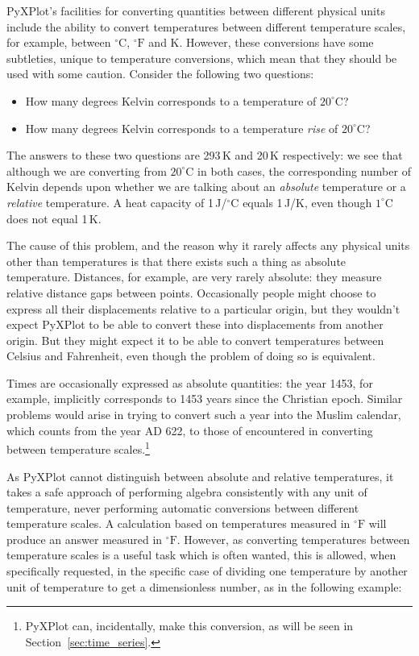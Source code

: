 PyXPlot's facilities for converting quantities between different physical units
include the ability to convert temperatures between different temperature
scales, for example, between $^\circ\mathrm{C}$, $^\circ\mathrm{F}$ and K.
However, these conversions have some subtleties, unique to temperature
conversions, which mean that they should be used with some caution. Consider
the following two questions:
\begin{itemize}
\item How many degrees Kelvin corresponds to a temperature of $20^\circ$C?
\item How many degrees Kelvin corresponds to a temperature {\it rise} of $20^\circ$C?
\end{itemize}
The answers to these two questions are 293\,K and 20\,K respectively: we see
that although we are converting from $20^\circ$C in both cases, the
corresponding number of Kelvin depends upon whether we are talking about an
{\it absolute} temperature or a {\it relative} temperature. A heat capacity of
1\,J/$^\circ$C equals 1\,J/K, even though $1^\circ$C does not equal 1\,K.

The cause of this problem, and the reason why it rarely affects any physical
units other than temperatures is that there exists such a thing as absolute
temperature. Distances, for example, are very rarely absolute: they measure
relative distance gaps between points. Occasionally people might choose to
express all their displacements relative to a particular origin, but they
wouldn't expect PyXPlot to be able to convert these into displacements from
another origin. But they might expect it to be able to convert temperatures
between Celsius and Fahrenheit, even though the problem of doing so is
equivalent.

Times are occasionally expressed as absolute quantities: the year 1453, for
example, implicitly corresponds to 1453 years since the Christian epoch.
Similar problems would arise in trying to convert such a year into the Muslim
calendar, which counts from the year {\footnotesize AD} 622, to those of
encountered in converting between temperature scales.\footnote{PyXPlot can,
incidentally, make this conversion, as will be seen in
Section~\ref{sec:time_series}.}

As PyXPlot cannot distinguish between absolute and relative temperatures, it
takes a safe approach of performing algebra consistently with any unit of
temperature, never performing automatic conversions between different
temperature scales. A calculation based on temperatures measured in
$^\circ\mathrm{F}$ will produce an answer measured in $^\circ\mathrm{F}$.
However, as converting temperatures between temperature scales is a useful task
which is often wanted, this is allowed, when specifically requested, in the
specific case of dividing one temperature by another unit of temperature to get
a dimensionless number, as in the following example:

